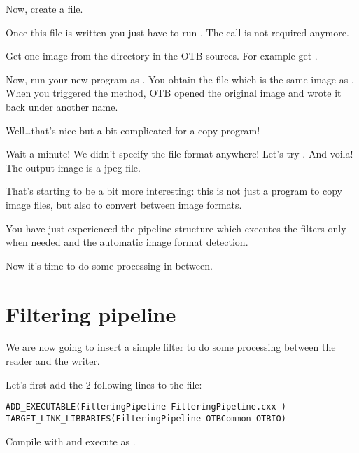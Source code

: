 Now, create a  file.



Once this file is written you just have to run . The
 call is not required anymore.

Get one image from the  directory in the OTB sources.
For example get .

Now, run your new program as . You
obtain the file  which is the same image as
. When you triggered the  method, OTB opened
the original image and wrote it back under another name.

Well\ldots that's nice but a bit complicated for a copy program!

Wait a minute! We didn't specify the file format anywhere! Let's try
. And voila! The output image is a jpeg
file.

That's starting to be a bit more interesting: this is not just a program to copy
image files, but also to convert between image formats.

You have just experienced the pipeline structure which executes the
filters only when needed and the automatic image format detection.

Now it's time to do some processing in between.


\section{Filtering pipeline}
\label{sec:TutorialFiltering}


We are now going to insert a simple filter to do some processing between the
reader and the writer.

Let's first add the 2 following lines to the  file:

\begin{small}
\begin{verbatim}
ADD_EXECUTABLE(FilteringPipeline FilteringPipeline.cxx )
TARGET_LINK_LIBRARIES(FilteringPipeline OTBCommon OTBIO)
\end{verbatim}
\end{small}



Compile with  and execute as .


